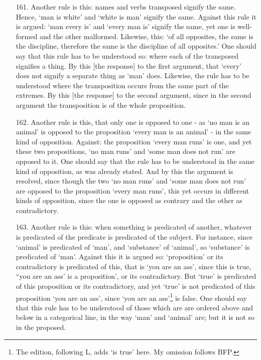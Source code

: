 \documentclass[]{article}
\begin{document}
\begin{itemize}
\item[161.] Another rule is this: names and verbs transposed signify the same. Hence, `man is white' and `white is man' signify the same. Against this rule it is argued: `man every is' and `every man is' signify the same, yet one is well-formed and the other malformed. Likewise, this: `of all opposites, the same is the discipline, therefore the same is the discipline of all opposites.' One should say that this rule has to be understood so: where each of the transposed signifies a thing. By this [the response] to the first argument, that `every' does not signify a separate thing as `man' does. Likewise, the rule has to be understood where the transposition occurs from the same part of the extremes. By this [the response] to the second argument, since in the second argument the transposition is of the whole proposition.
\item[162.] Another rule is this, that only one is opposed to one - as `no man is an animal' is opposed to the proposition `every man is an animal' - in the same kind of opposition. Against: the proposition `every man runs' is one, and yet these two propositions, `no man runs' and `some man does not run' are opposed to it. One should say that the rule has to be understood in the same kind of opposition, as was already stated. And by this the argument is resolved, since though the two `no man runs' and `some man does not run' are opposed to the proposition `every man runs', this yet occurs in different kinds of opposition, since the one is opposed as contrary and the other as contradictory. 
\item[163.] Another rule is this: when something is predicated of another, whatever is predicated of the predicate is predicated of the subject. For instance, since `animal' is predicated of `man', and `substance' of `animal', so `substance' is predicated of `man'. Against this it is argued so: `proposition' or its contradictory is predicated of this, that is `you are an ass', since this is true, ``you are an ass' is a proposition', or its contradictory. But `true' is predicated of this proposition or its contradictory, and yet `true' is not predicated of this proposition `you are an ass', since `you are an ass'\footnote{The edition, following L, adds `is true' here. My omission follows BFP.} is false. One should say that this rule has to be understood of those which are are ordered above and below in a categorical line, in the way `man' and `animal' are; but it is not so in the proposed.

\end{itemize}
\end{document}
